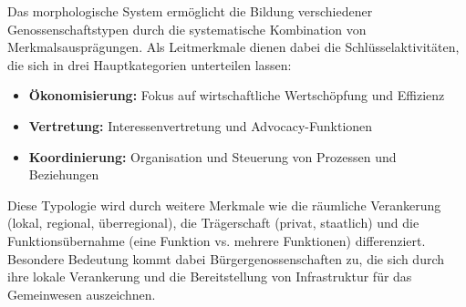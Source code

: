 Das morphologische System ermöglicht die Bildung verschiedener Genossenschaftstypen durch die systematische Kombination von Merkmalsausprägungen. Als Leitmerkmale dienen dabei die Schlüsselaktivitäten, die sich in drei Hauptkategorien unterteilen lassen:

\begin{itemize}
\item \textbf{Ökonomisierung:} Fokus auf wirtschaftliche Wertschöpfung und Effizienz
\item \textbf{Vertretung:} Interessenvertretung und Advocacy-Funktionen
\item \textbf{Koordinierung:} Organisation und Steuerung von Prozessen und Beziehungen
\end{itemize}

Diese Typologie wird durch weitere Merkmale wie die räumliche Verankerung (lokal, regional, überregional), die Trägerschaft (privat, staatlich) und die Funktionsübernahme (eine Funktion vs. mehrere Funktionen) differenziert. Besondere Bedeutung kommt dabei Bürgergenossenschaften zu, die sich durch ihre lokale Verankerung und die Bereitstellung von Infrastruktur für das Gemeinwesen auszeichnen.
